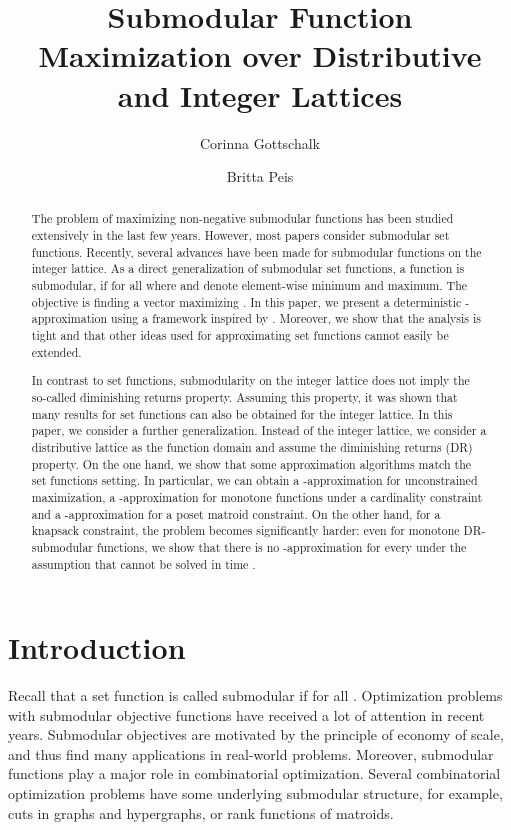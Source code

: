 \documentclass{article}
\author{Corinna Gottschalk \and Britta Peis}
\title{Submodular Function Maximization over Distributive and Integer Lattices}
\theoremstyle{plain}
\theoremstyle{definition}
\begin{document}
\maketitle

\begin{abstract}
\noindent
The problem of maximizing non-negative submodular functions has been studied extensively in the last few years. 
However, most papers consider submodular set functions. 
Recently, several advances have been made for submodular functions on the integer lattice. 
As a direct generalization of submodular set functions, a function  is submodular, if
 for all  where  and  denote 
element-wise minimum and maximum. 
The objective is finding a vector  maximizing . In this paper, we present a deterministic -approximation
using a framework inspired by \cite{DoubleGreedy}.
Moreover, we show that the analysis is tight and that other ideas used for approximating set functions cannot easily be extended. 

In contrast to set functions, submodularity on the integer lattice does not 
imply the so-called diminishing returns property. Assuming this property, it was shown that many results for set functions can
also be obtained for the integer lattice. 
In this paper, we consider a further generalization. Instead of the integer lattice, we consider a distributive lattice as the function domain
and assume the diminishing returns (DR) property.
On the one hand, we show that some approximation algorithms match the set functions setting. In particular, we can obtain a
-approximation for unconstrained maximization, a -approximation for monotone functions under a cardinality constraint and 
a -approximation for a poset matroid constraint. 
On the other hand, for a knapsack constraint, the problem becomes significantly harder: 
even for monotone DR-submodular functions, we show that there is no -approximation 
for every  under the assumption that  cannot be solved in time . 
\end{abstract}



\section{Introduction}
Recall that a set function  is called submodular if  for all . 
Optimization problems with submodular objective functions have received a lot of attention in recent years.
Submodular objectives are motivated by the principle of economy of scale, and thus find many applications in real-world problems.
Moreover, submodular functions play a major role in combinatorial optimization.
Several combinatorial optimization problems have some underlying submodular structure, for example, 
cuts in graphs and hypergraphs, or rank functions of matroids.
\end{document}

